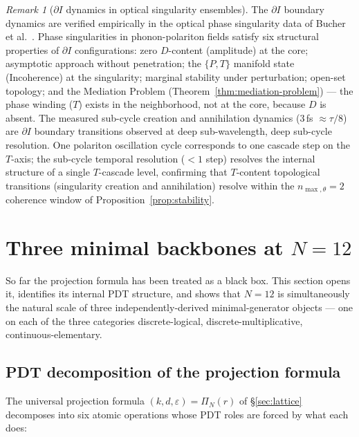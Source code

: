 \documentclass[11pt,a4paper]{article}
\theoremstyle{definition}
\theoremstyle{remark}
\newtheorem{remark}[theorem]{Remark}
\begin{document}
\begin{remark}[$\partial I$ dynamics in optical singularity ensembles]\label{rem:dI-optics}
The $\partial I$ boundary dynamics are verified empirically in the optical phase singularity data of Bucher et al.~\cite{Bucher2025}. Phase singularities in phonon-polariton fields satisfy six structural properties of $\partial I$ configurations: zero $D$-content (amplitude) at the core; asymptotic approach without penetration; the $\{P,T\}$ manifold state (Incoherence) at the singularity; marginal stability under perturbation; open-set topology; and the Mediation Problem (Theorem~\ref{thm:mediation-problem}) --- the phase winding ($T$) exists in the neighborhood, not at the core, because $D$ is absent. The measured sub-cycle creation and annihilation dynamics ($3$\,fs $\approx \tau/8$) are $\partial I$ boundary transitions observed at deep sub-wavelength, deep sub-cycle resolution. One polariton oscillation cycle corresponds to one cascade step on the $T$-axis; the sub-cycle temporal resolution ($< 1$ step) resolves the internal structure of a single $T$-cascade level, confirming that $T$-content topological transitions (singularity creation and annihilation) resolve within the $n_{\max,\theta}=2$ coherence window of Proposition~\ref{prop:stability}.
\end{remark}

\section{Three minimal backbones at $N=12$}\label{sec:backbones}

So far the projection formula has been treated as a black box. This section opens it, identifies its internal PDT structure, and shows that $N=12$ is simultaneously the natural scale of three independently-derived minimal-generator objects --- one on each of the three categories discrete-logical, discrete-multiplicative, continuous-elementary.

\subsection{PDT decomposition of the projection formula}\label{subsec:pdt-decomp}

The universal projection formula $(k,d,\varepsilon) = \Pi_{N}(r)$ of \S\ref{sec:lattice} decomposes into six atomic operations whose PDT roles are forced by what each does:
\end{document}
